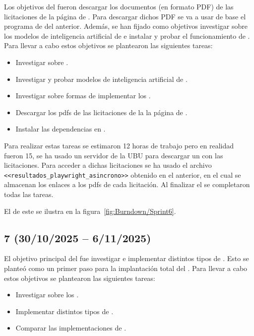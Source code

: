 Los objetivos del  fueron descargar los documentos (en formato PDF) de las licitaciones de la página de \contsec{}. Para descargar dichos PDF se va a usar de base el programa de  del  anterior. Además, se han fijado como objetivos investigar sobre los modelos de inteligencia artificial de  e instalar y probar el funcionamiento de .
Para llevar a cabo estos objetivos se plantearon las siguientes tareas:
\begin{itemize}
\tightlist
	\item Investigar sobre .
	\item Investigar y probar modelos de inteligencia artificial de .
	\item Investigar sobre formas de implementar los .
	\item Descargar los pdfs de las licitaciones de la la página de \contsec{}.
	\item Instalar las dependencias en .
\end{itemize}

Para realizar estas tareas se estimaron 12 horas de trabajo pero en realidad fueron 15, se ha usado un servidor de la UBU para descargar un  con las licitaciones. Para acceder a dichas licitaciones se ha usado el archivo \texttt{<<resultados\_playwright\_asincrono>>} obtenido en el  anterior, en el cual se almacenan los enlaces a los pdfs de cada licitación. Al finalizar el  se completaron todas las tareas.

El  de este  se ilustra en la figura~\ref{fig:Burndown/Sprint6}.

\subsection{ 7 (30/10/2025 -- 6/11/2025)}

El objetivo principal del  fue investigar e implementar distintos tipos de . Esto se planteó como un primer paso para la implantación total del .
Para llevar a cabo estos objetivos se plantearon las siguientes tareas:
\begin{itemize}
\tightlist
	\item Investigar sobre los .
	\item Implementar distintos tipos de .
	\item Comparar las implementaciones de .
\end{itemize}

